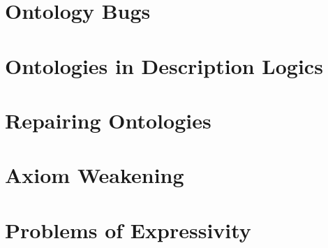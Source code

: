 \section{Ontology Bugs} \label{ontology-bugs}



\section{Ontologies in Description Logics} \label{ontologies-in-dl}



\section{Repairing Ontologies} \label{ontology-repair}



\section{Axiom Weakening} \label{axiom-weakening}



\section{Problems of Expressivity} \label{expressivity-problems}


